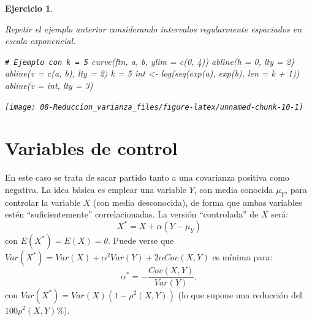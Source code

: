 \documentclass[
]{book}
\newenvironment{Shaded}{\begin{snugshade}}{\end{snugshade}}
\newcommand{\AttributeTok}[1]{\textcolor[rgb]{0.77,0.63,0.00}{#1}}
\newcommand{\CommentTok}[1]{\textcolor[rgb]{0.56,0.35,0.01}{\textit{#1}}}
\newcommand{\DecValTok}[1]{\textcolor[rgb]{0.00,0.00,0.81}{#1}}
\newcommand{\FunctionTok}[1]{\textcolor[rgb]{0.00,0.00,0.00}{#1}}
\newcommand{\NormalTok}[1]{#1}
\newcommand{\OtherTok}[1]{\textcolor[rgb]{0.56,0.35,0.01}{#1}}
\newcommand{\SpecialCharTok}[1]{\textcolor[rgb]{0.00,0.00,0.00}{#1}}
\theoremstyle{break}
\newtheorem{exercise}{Ejercicio}[chapter]
\theoremstyle{nonumberplain}
\renewcommand{\CommentTok}[1]{\textcolor[rgb]{0.41,0.41,0.41}{\texttt{#1}}}
\begin{document}
\begin{exercise}
\protect\hypertarget{exr:integraleb}{}\label{exr:integraleb}

Repetir el ejemplo anterior considerando intervalos regularmente espaciados en escala exponencial.

\begin{Shaded}
\begin{Highlighting}[]
\CommentTok{\# Ejemplo con k = 5}
\FunctionTok{curve}\NormalTok{(ftn, a, b, }\AttributeTok{ylim =} \FunctionTok{c}\NormalTok{(}\DecValTok{0}\NormalTok{, }\DecValTok{4}\NormalTok{))}
\FunctionTok{abline}\NormalTok{(}\AttributeTok{h =} \DecValTok{0}\NormalTok{, }\AttributeTok{lty =} \DecValTok{2}\NormalTok{)}
\FunctionTok{abline}\NormalTok{(}\AttributeTok{v =} \FunctionTok{c}\NormalTok{(a, b), }\AttributeTok{lty =} \DecValTok{2}\NormalTok{)}
\NormalTok{k }\OtherTok{=} \DecValTok{5}
\NormalTok{int }\OtherTok{\textless{}{-}} \FunctionTok{log}\NormalTok{(}\FunctionTok{seq}\NormalTok{(}\FunctionTok{exp}\NormalTok{(a), }\FunctionTok{exp}\NormalTok{(b), }\AttributeTok{len =}\NormalTok{ k }\SpecialCharTok{+} \DecValTok{1}\NormalTok{))}
\FunctionTok{abline}\NormalTok{(}\AttributeTok{v =}\NormalTok{ int, }\AttributeTok{lty =} \DecValTok{3}\NormalTok{)}
\end{Highlighting}
\end{Shaded}

\begin{center}\texttt{[image: 08-Reduccion\_varianza\_files/figure-latex/unnamed-chunk-10-1]} \end{center}

\end{exercise}

\hypertarget{variables-de-control}{%
\section{Variables de control}\label{variables-de-control}}

En este caso se trata de sacar partido tanto a una covarianza
positiva como negativa.
La idea básica es emplear una variable \(Y\), con media conocida
\(\mu_{Y}\), para controlar la variable \(X\) (con media desconocida),
de forma que ambas variables estén ``suficientemente'' correlacionadas.
La versión ``controlada'' de \(X\) será:
\[X^{\ast}=X+\alpha \left(  Y-\mu_{Y}\right)\]
con \(E(X^{\ast})=E(X)=\theta\).
Puede verse que
\(Var(X^{\ast})=Var(X)+\alpha^{2}Var(Y)+2\alpha Cov(X,Y)\)
es mínima para:
\[\alpha^{\ast}=-\frac{Cov(X,Y)}{Var(Y)},\]
con \(Var(X^{\ast}) = Var(X) \left( 1-\rho^{2} \left( X, Y \right) \right)\)
(lo que supone una reducción del \(100\rho^{2}\left( X, Y \right) \%\)).
\end{document}
